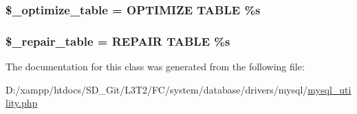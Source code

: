 \subsubsection[{\$\+\_\+optimize\+\_\+table}]{\setlength{\rightskip}{0pt plus 5cm}\$\+\_\+optimize\+\_\+table = \textquotesingle{}O\+P\+T\+I\+M\+I\+Z\+E T\+A\+B\+L\+E \%s\textquotesingle{}\hspace{0.3cm}{\ttfamily [protected]}}\label{class_c_i___d_b__mysql__utility_a083199e5c22c78912dae0a47bb2d7fad}
\hypertarget{class_c_i___d_b__mysql__utility_a5cf925cbd52e3f6ba5b7ada3fa436efc}{}
\subsubsection[{\$\+\_\+repair\+\_\+table}]{\setlength{\rightskip}{0pt plus 5cm}\$\+\_\+repair\+\_\+table = \textquotesingle{}R\+E\+P\+A\+I\+R T\+A\+B\+L\+E \%s\textquotesingle{}\hspace{0.3cm}{\ttfamily [protected]}}\label{class_c_i___d_b__mysql__utility_a5cf925cbd52e3f6ba5b7ada3fa436efc}


The documentation for this class was generated from the following file\+:\begin{DoxyCompactItemize}
\item 
D\+:/xampp/htdocs/\+S\+D\+\_\+\+Git/\+L3\+T2/\+F\+C/system/database/drivers/mysql/\hyperlink{mysql__utility_8php}{mysql\+\_\+utility.\+php}\end{DoxyCompactItemize}

